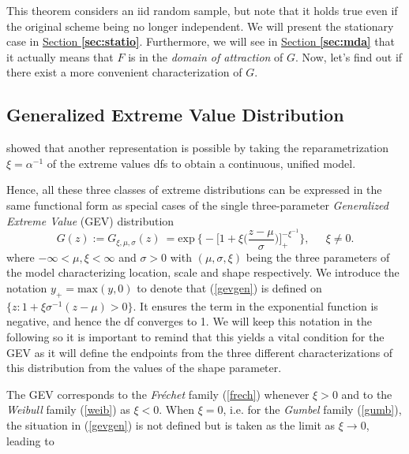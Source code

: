 This theorem considers an iid random sample, but note that it holds true even if the original scheme being no longer independent. We will present the stationary case in 
\hyperref[sec:statio]{Section \textbf{\ref{sec:statio}}}. Furthermore, we will see in \hyperref[sec:mda]{Section \textbf{\ref{sec:mda}}} that it actually means that $F$ is in the \emph{domain of attraction} of $G$. Now, let's find out if there exist a more convenient characterization of $G$.  %

\subsection{Generalized Extreme Value Distribution}\label{sec:gevdistri}

\citet{von_mises_distribution_1936} showed that another representation is possible by taking the reparametrization $\xi=\alpha^{-1}$ of the extreme values dfs to obtain a continuous, unified model.

Hence, all these three classes of extreme distributions can be expressed in the same functional form as special cases of the single three-parameter \textit{Generalized Extreme Value} (GEV) distribution 
\begin{equation} \label{gevgen}
G(z):=G_{\xi,\mu,\sigma}(z)\ =\text{exp}\ \Bigg\{-\bigg[1+\xi\bigg(\frac{z-\mu}{\sigma}\bigg)\bigg]_+^{-\xi^{-1}}\Bigg\}, \quad \ \ \xi\neq 0.
\end{equation}
where $-\infty<\mu,\xi<\infty$ and $\sigma>0$ with $(\mu,\sigma,\xi)$ being the three parameters of the model characterizing location, scale and shape respectively. We introduce the notation $y_+=\text{max}(y,0)$ to denote that (\ref{gevgen}) is defined on $\big\{z:1+\xi\sigma^{-1}(z-\mu)>0\big\}$. It ensures the term in the exponential function is negative, and hence the df converges to 1. We will keep this notation in the following so it is important to remind that this yields a vital condition for the GEV as it will define the endpoints from the three different characterizations of this distribution from the values of the shape 
parameter. %

The GEV corresponds to the \emph{Fréchet} family (\ref{frech}) whenever $\xi>0$ and to the \emph{Weibull} family (\ref{weib}) as $\xi<0$.
When $\xi=0$, i.e. for the \emph{Gumbel} family (\ref{gumb}), the situation in (\ref{gevgen}) is not defined but is taken as the limit as $\xi\to 0$, leading to 

